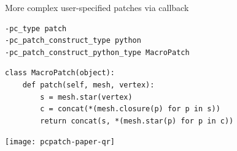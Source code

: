 \documentclass[cmyk,luatex,paperwidth=60in,paperheight=36in,landscape]{baposter}
\begin{document}
\begin{poster}
\begin{posterbox}[name=config, span=2,column=2]{}
    More complex user-specified patches via callback
\begin{verbatim}
-pc_type patch
-pc_patch_construct_type python
-pc_patch_construct_python_type MacroPatch
\end{verbatim}
\begin{verbatim}
class MacroPatch(object):
    def patch(self, mesh, vertex):
        s = mesh.star(vertex)
        c = concat(*(mesh.closure(p) for p in s))
        return concat(s, *(mesh.star(p) for p in c))
\end{verbatim}
  \end{posterbox}
  \begin{posterbox}[name=details, column=5, span=1]{}
    \texttt{[image: pcpatch-paper-qr]}
  \end{posterbox}

\end{poster}
\end{document}
